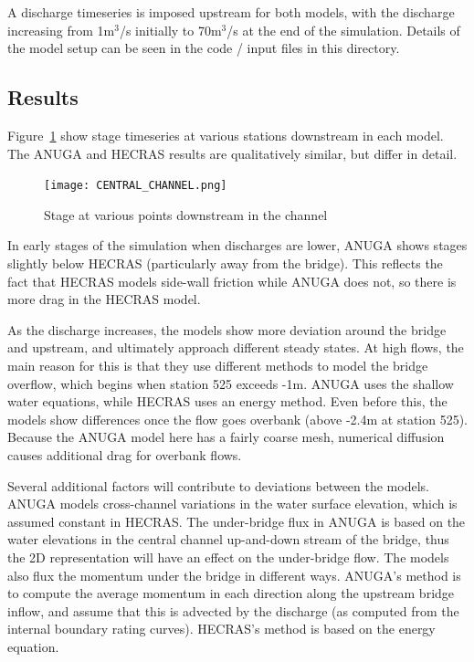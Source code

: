A discharge timeseries is imposed upstream for both models, with the discharge
increasing from 1m$^3$/s initially to 70m$^3$/s at the end of the simulation.
Details of the model setup can be seen in the code / input files in this
directory.

\subsection{Results}

Figure~\ref{Reach} show stage timeseries at various stations downstream in each
model. The ANUGA and HECRAS results are qualitatively similar, but differ in
detail. 

\begin{figure}
\begin{center}
\texttt{[image: CENTRAL\_CHANNEL.png]}
\end{center}
\caption{Stage at various points downstream in the channel}
\label{Reach}
\end{figure}

In early stages of the simulation when discharges are lower, ANUGA shows stages
slightly below HECRAS (particularly away from the bridge). This reflects the
fact that HECRAS models side-wall friction while ANUGA does not, so there is
more drag in the HECRAS model. 

As the discharge increases, the models show more deviation around the bridge
and upstream, and ultimately approach different steady states. At high flows,
the main reason for this is that they use different methods to model the bridge
overflow, which begins when station 525 exceeds -1m. ANUGA uses the shallow
water equations, while HECRAS uses an energy method. Even before this, the
models show differences once the flow goes overbank (above -2.4m at station
525). Because the ANUGA model here has a fairly coarse mesh, numerical
diffusion causes additional drag for overbank flows. 

Several additional factors will contribute to deviations between the models. ANUGA
models cross-channel variations in the water surface elevation, which is
assumed constant in HECRAS. The under-bridge flux in ANUGA is based on the
water elevations in the central channel up-and-down stream of the bridge, thus
the 2D representation will have an effect on the under-bridge flow. The models
also flux the momentum under the bridge in different ways. ANUGA's method is to
compute the average momentum in each direction along the upstream bridge
inflow, and assume that this is advected by the discharge (as computed from the
internal boundary rating curves). HECRAS's method is based on the energy
equation. 


